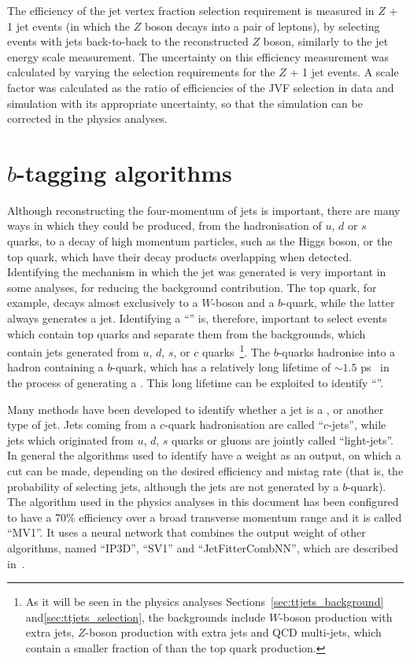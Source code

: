 The efficiency of the jet vertex fraction selection requirement is measured in $Z$ + 1 jet events (in which the $Z$ boson decays into a pair of leptons), by selecting
events with jets back-to-back to the reconstructed $Z$ boson, similarly to the jet energy scale measurement.
The uncertainty on this efficiency measurement was calculated by varying the selection requirements for
the $Z$ + 1 jet events. A scale factor was calculated as the ratio of efficiencies of the JVF selection in data and simulation with its appropriate uncertainty,
so that the simulation can be corrected in the physics analyses.

\section{$b$-tagging algorithms}
\label{sec:atlas_btag}

Although reconstructing the four-momentum of jets is important, there are many ways in which they could be produced, from the hadronisation of $u$, $d$ or $s$ quarks, to
a decay of high momentum particles, such as the Higgs boson, or the top quark, which have their decay products overlapping when detected. Identifying the mechanism in
which the jet was generated is very important in some analyses, for reducing the background contribution. The top quark, for example, decays almost exclusively to a
$W$-boson and a $b$-quark, while the latter always
generates a jet. Identifying a ``\bjet'' is, therefore, important to select events which contain top quarks and separate them
from the backgrounds, which contain jets generated from $u$, $d$, $s$, or $c$ quarks~\footnote{As it will be seen in the physics analyses
Sections~\ref{sec:ttjets_background} and\ref{sec:ttjets_selection}, the backgrounds
include $W$-boson production with extra jets, $Z$-boson production with extra jets and QCD multi-jets, which contain a smaller fraction of \bjets than the top quark production.}.
The $b$-quarks hadronise into a hadron containing a $b$-quark, which has a relatively long lifetime of $\sim 1.5$ ps~\cite{pdg2012}
in the process of generating a \bjet. This long lifetime can be exploited
to identify ``\bjets''.

Many methods have been developed to identify whether a jet is a \bjet, or another type of jet. Jets coming from a $c$-quark hadronisation are called ``$c$-jets'', while jets which
originated from $u$, $d$, $s$ quarks or gluons are jointly called ``light-jets''. In general the algorithms used to identify \bjets have a weight as an output, on which
a cut can be made, depending on the desired efficiency and mistag rate (that is, the probability of selecting jets, although the jets are not generated by a $b$-quark).
The algorithm used in the physics analyses in this document has been configured to have a 70\% efficiency over a broad transverse momentum range and it is called ``MV1''. It
uses a neural network that combines the output weight of other algorithms, named ``IP3D'', ``SV1'' and ``JetFitterCombNN'', which are described in~\cite{btag2011,btagalgos}.

